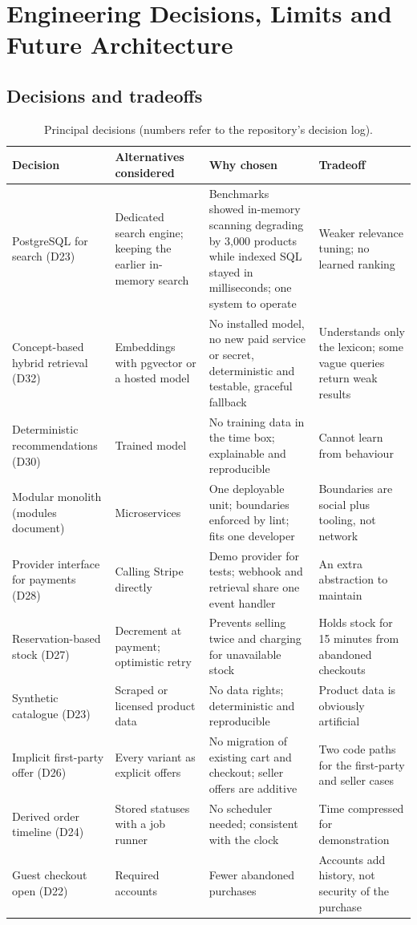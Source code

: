 \chapter{Engineering Decisions, Limits and Future Architecture}
\label{ch:decisions}

\section{Decisions and tradeoffs}

\begin{table}[H]
\centering
\caption{Principal decisions (numbers refer to the repository's decision log).}
\label{tab:decisions}
\footnotesize
\begin{tabularx}{\linewidth}{@{}p{2.7cm}XXX@{}}
\toprule
Decision & Alternatives considered & Why chosen & Tradeoff \\
\midrule
PostgreSQL for search (D23) & Dedicated search engine; keeping the earlier in-memory search & Benchmarks showed in-memory scanning degrading by 3,000 products while indexed SQL stayed in milliseconds; one system to operate & Weaker relevance tuning; no learned ranking \\
Concept-based hybrid retrieval (D32) & Embeddings with pgvector or a hosted model & No installed model, no new paid service or secret, deterministic and testable, graceful fallback & Understands only the lexicon; some vague queries return weak results \\
Deterministic recommendations (D30) & Trained model & No training data in the time box; explainable and reproducible & Cannot learn from behaviour \\
Modular monolith (modules document) & Microservices & One deployable unit; boundaries enforced by lint; fits one developer & Boundaries are social plus tooling, not network \\
Provider interface for payments (D28) & Calling Stripe directly & Demo provider for tests; webhook and retrieval share one event handler & An extra abstraction to maintain \\
Reservation-based stock (D27) & Decrement at payment; optimistic retry & Prevents selling twice and charging for unavailable stock & Holds stock for 15 minutes from abandoned checkouts \\
Synthetic catalogue (D23) & Scraped or licensed product data & No data rights; deterministic and reproducible & Product data is obviously artificial \\
Implicit first-party offer (D26) & Every variant as explicit offers & No migration of existing cart and checkout; seller offers are additive & Two code paths for the first-party and seller cases \\
Derived order timeline (D24) & Stored statuses with a job runner & No scheduler needed; consistent with the clock & Time compressed for demonstration \\
Guest checkout open (D22) & Required accounts & Fewer abandoned purchases & Accounts add history, not security of the purchase \\
\bottomrule
\end{tabularx}
\end{table}

